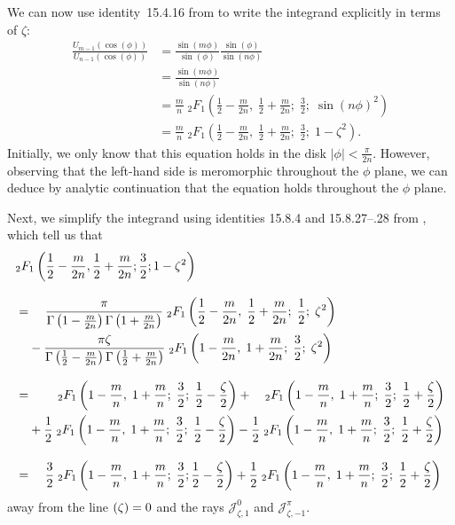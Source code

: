\documentclass{article}
\let\Re\relax
\DeclareMathOperator{\Re}{Re}
\theoremstyle{definition}
\theoremstyle{plain}
\newenvironment{old}{\color{RoyalBlue}}{\color{black}}
\begin{document}
\begin{old}
We can now use identity~15.4.16 from \cite{dlmf} to write the integrand explicitly in terms of $\zeta$:
\begin{align*}
\frac{U_{m-1}(\cos(\phi))}{U_{n-1}(\cos(\phi))} &= \frac{\sin(m\phi)}{\sin(\phi)}\frac{\sin(\phi)}{\sin(n \phi)}\\
& = \frac{\sin(m\phi)}{\sin(n \phi)}\\
& = \frac{m}{n}\;{}_2F_1\left(\frac{1}{2} - \frac{m}{2n},\;\frac{1}{2} + \frac{m}{2n};\;\frac{3}{2};\;\sin(n \phi)^2\right) \\
& = \frac{m}{n}\;{}_2F_1\left(\frac{1}{2} - \frac{m}{2n},\;\frac{1}{2} + \frac{m}{2n};\;\frac{3}{2};\;1 - \zeta^2\right).
\end{align*}
Initially, we only know that this equation holds in the disk $|\phi| < \tfrac{\pi}{2n}$. However, observing that the left-hand side is meromorphic throughout the $\phi$ plane, we can deduce by analytic continuation that the equation holds throughout the $\phi$ plane.

Next, we simplify the integrand using identities 15.8.4 and 15.8.27\;--.28 from \cite{dlmf}, which tell us that\begin{align*}
&{}_2F_1\left(\frac{1}{2} - \frac{m}{2n}, \frac{1}{2} + \frac{m}{2n}; \frac{3}{2}; 1 - \zeta^2\right) \\[3mm]
& =\; \hphantom{+} \frac{\pi}{\Gamma\left(1-\frac{m}{2n}\right) \Gamma\left(1 + \frac{m}{2n}\right)}\;{}_2F_1\left(\frac{1}{2} - \frac{m}{2n},\;\frac{1}{2} + \frac{m}{2n};\;\frac{1}{2};\;\zeta^2\right) \\
& \hphantom{=}\; - \frac{\pi \zeta}{\Gamma\left(\frac{1}{2} - \frac{m}{2n}\right) \Gamma\left(\frac{1}{2} + \frac{m}{2n}\right)}\;{}_2F_1\left(1 - \frac{m}{2n},\;1 + \frac{m}{2n};\;\frac{3}{2};\;\zeta^2\right) \\[3mm]
& =\; \hphantom{+ \frac{0}{0}}\;{}_2F_1\left(1 - \frac{m}{n},\;1 + \frac{m}{n};\;\frac{3}{2};\;\frac{1}{2} - \frac{\zeta}{2}\right) + \hphantom{\frac{0}{0}}\;{}_2F_1\left(1-\frac{m}{n},\;1 + \frac{m}{n};\;\frac{3}{2};\;\frac{1}{2} + \frac{\zeta}{2}\right) \\
& \hphantom{=}\; + \frac{1}{2}\;{}_2F_1\left(1-\frac{m}{n},\;1+\frac{m}{n};\;\frac{3}{2};\;\frac{1}{2} - \frac{\zeta}{2}\right) - \frac{1}{2}\;{}_2F_1\left(1-\frac{m}{n},\;1 + \frac{m}{n};\;\frac{3}{2};\;\frac{1}{2} + \frac{\zeta}{2}\right) \\[3mm]
& =\; \hphantom{+} \frac{3}{2}\;{}_2F_1\left(1 - \frac{m}{n},\;1 + \frac{m}{n};\;\frac{3}{2};\frac{1}{2} - \frac{\zeta}{2}\right) + \frac{1}{2}\;{}_2F_1\left(1 - \frac{m}{n},\;1 + \frac{m}{n};\;\frac{3}{2};\;\frac{1}{2} + \frac{\zeta}{2}\right)
\end{align*}
away from the line $\Re(\zeta) = 0$ and the rays $\mathcal{J}^0_{\zeta,1}$ and $\mathcal{J}^\pi_{\zeta,-1}$.


\end{old}
\end{document}
